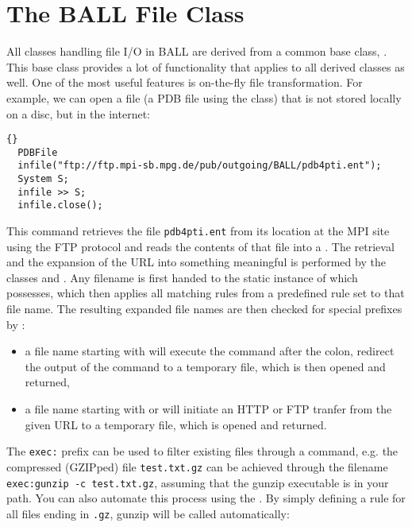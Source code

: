 \section{The BALL File Class}

All classes handling file I/O in BALL are derived from a common
base class, . This base class provides a lot of
functionality that applies to all derived classes as well.
One of the most useful features is on-the-fly file transformation.
For example, we can open a file (\eg a PDB file using the  
class) that is not stored locally on a disc, but in the internet:

\begin{lstlisting}{}
  PDBFile
  infile("ftp://ftp.mpi-sb.mpg.de/pub/outgoing/BALL/pdb4pti.ent");
  System S;
  infile >> S;
  infile.close();
\end{lstlisting}

\noindent
This command retrieves the file {\tt pdb4pti.ent} from its location at the MPI
site using the FTP protocol and reads the contents of that file into a
. The retrieval and the expansion of the URL into something
meaningful is performed by the classes  and
. Any filename is first handed to the static instance of
 which  possesses, which then applies
all matching rules from a predefined rule set to that file name. The resulting
expanded file names are then checked for special prefixes by :
\begin{itemize}
  \item a file name starting with  will execute the command
        after the colon, redirect the output of the command to a temporary
        file, which is then opened and returned,

  \item a file name starting with  or  will
        initiate an HTTP or FTP tranfer from the given URL to a temporary file,
        which is opened and returned.
\end{itemize}

\noindent 
The {\tt exec:} prefix can be used to filter existing files through a command, 
e.g. the compressed (GZIPped) file {\tt test.txt.gz} can be achieved through
the filename {\tt exec:gunzip -c test.txt.gz}, assuming that the gunzip
executable is in your path. You can also automate this process using the
. By simply defining a rule for all files ending
in {\tt .gz}, gunzip will be called automatically:

